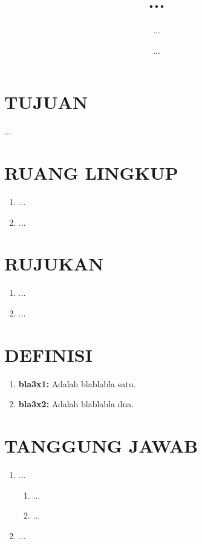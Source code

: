 \documentclass[12pt]{soi}
\title{...}
\date{...}
\author{...}
\begin{document}
    \maketitle

    \section{TUJUAN}
    ...

    \section{RUANG LINGKUP}
    \begin{enumerate}
        \item ...
        \item ...
    \end{enumerate}

    \section{RUJUKAN}
    \begin{enumerate}
        \item ...
        \item ...
    \end{enumerate}

    \section{DEFINISI}
    \begin{enumerate}
        \item \textbf{bla3x1:} Adalah blablabla satu.
        \item \textbf{bla3x2:} Adalah blablabla dua.
    \end{enumerate}

    \section{TANGGUNG JAWAB}
    \begin{enumerate}
        \item ...
            \begin{enumerate}
                \item ...
                \item ...
            \end{enumerate}
        \item ...
    \end{enumerate}
\end{document}
